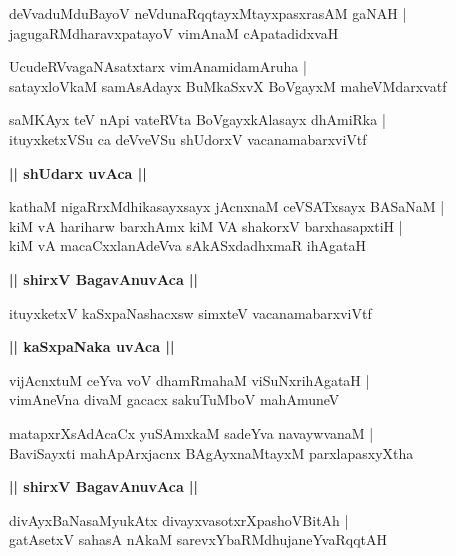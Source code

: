 \documentclass[twoside,12pt,openright]{book}
\newcounter{shloka}[chapter]
\def\uvaca#1{\centerline{{\large\textbf{#1}}}}
\begin{document}
\begin{shloka}%
deVvaduMduBayoV neVdunaRqqtayxMtayxpasxrasAM gaNAH |\\
jagugaRMdharavxpatayoV vimAnaM cApatadidxvaH 
\end{shloka}

\begin{shloka}%
UcudeRVvagaNAsatxtarx vimAnamidamAruha |\\
satayxloVkaM samAsAdayx BuMkaSxvX BoVgayxM maheVMdarxvatf 
\end{shloka}

\begin{shloka}%
saMKAyx teV nApi vateRVta BoVgayxkAlasayx dhAmiRka |\\
ituyxketxVSu ca deVveVSu shUdorxV vacanamabarxviVtf 
\end{shloka}

\uvaca{|| shUdarx uvAca ||}

\begin{shloka}%
kathaM nigaRrxMdhikasayxsayx jAcnxnaM ceVSATxsayx BASaNaM |\\
kiM vA hariharw barxhAmx kiM VA shakorxV barxhasapxtiH |\\
kiM vA macaCxxlanAdeVva sAkASxdadhxmaR ihAgataH 
\end{shloka}

\uvaca{|| shirxV BagavAnuvAca ||}

\begin{shloka}%
ituyxketxV kaSxpaNashacxsw simxteV vacanamabarxviVtf 
\end{shloka}

\uvaca{|| kaSxpaNaka uvAca ||}

\begin{shloka}%
vijAcnxtuM ceYva voV dhamRmahaM viSuNxrihAgataH |\\
vimAneVna divaM gacacx sakuTuMboV mahAmuneV
\end{shloka}

\begin{shloka}%
matapxrXsAdAcaCx yuSAmxkaM sadeYva navaywvanaM |\\
BaviSayxti mahApArxjacnx BAgAyxnaMtayxM parxlapasxyXtha 
\end{shloka}

\uvaca{|| shirxV BagavAnuvAca ||}

\begin{shloka}%
divAyxBaNasaMyukAtx divayxvasotxrXpashoVBitAh |\\
gatAsetxV sahasA nAkaM sarevxYbaRMdhujaneYvaRqqtAH 
\end{shloka}
\end{document}
